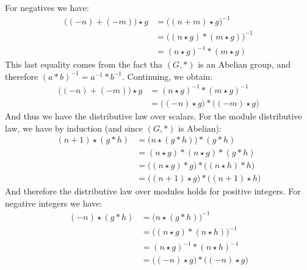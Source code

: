     For negatives we have:
    \begin{subequations}
        \begin{align}
            \big((\minus{n})+(\minus{m})\big)\star{g}
                &=\big((n+m)\star{g}\big)^{\minus{1}}\\
                &=\big((n\star{g})*(m\star{g})\big)^{\minus{1}}\\
                &=(n\star{g})^{\minus{1}}*(m\star{g})
        \end{align}
    \end{subequations}
    This last equality comes from the fact tha $(G,*)$ is an Abelian group, and
    therefore $(a*b)^{\minus{1}}=a^{\minus{1}}*b^{\minus{1}}$. Continuing, we
    obtain:
    \begin{subequations}
        \begin{align}
            \big((\minus{n})+(\minus{m})\big)\star{g}
            &=(n\star{g})^{\minus{1}}*(m\star{g})^{\minus{1}}\\
            &=\big((\minus{n})\star{g}\big)*\big((\minus{m})\star{g}\big)
        \end{align}
    \end{subequations}
    And thus we have the distributive law over scalars. For the module
    distributive law, we have by induction (and since $(G,*)$ is Abelian):
    \begin{subequations}
        \begin{align}
            (n+1)\star(g*h)
            &=\big(n\star(g*h)\big)*(g*h)\\
            &=(n\star{g})*(n\star{g})*(g*h)\\
            &=\big((n\star{g})*g\big)*\big((n\star{h})*h\big)\\
            &=\big((n+1)\star{g}\big)*\big((n+1)\star{h}\big)
        \end{align}
    \end{subequations}
    And therefore the distributive law over modules holds for positive integers.
    For negative integers we have:
    \begin{subequations}
        \begin{align}
            (\minus{n})\star(g*h)
            &=\big(n\star(g*h)\big)^{\minus{1}}\\
            &=\big((n\star{g})*(n\star{h})\big)^{\minus{1}}\\
            &=(n\star{g})^{\minus{1}}*(n\star{h})^{\minus{1}}\\
            &=\big((\minus{n})\star{g}\big)*\big((\minus{n})\star{g}\big)
        \end{align}
    \end{subequations}
